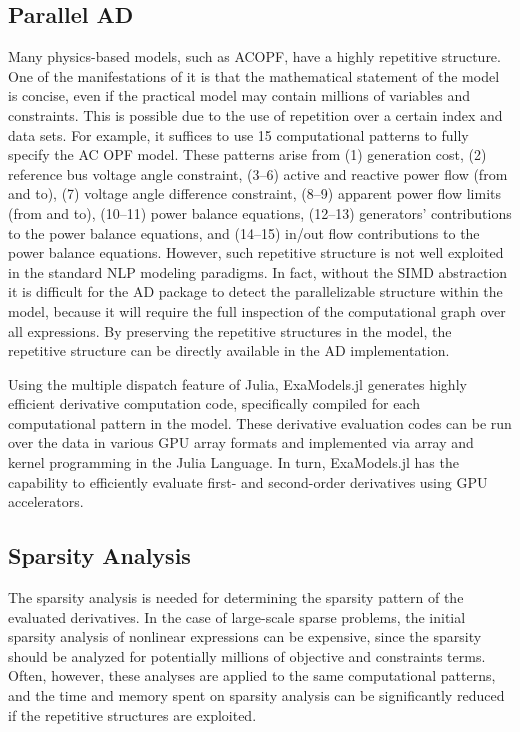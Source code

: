 \documentclass{IEEEtran4PSCC} %
\begin{document}
\subsection{Parallel AD}
\label{sec:simd:ad}
Many physics-based models, such as ACOPF, have a highly repetitive
structure. One of the manifestations of it is that the mathematical
statement of the model is concise, even if the practical model may contain
millions of variables and constraints. This is possible due to the use of
repetition over a certain index and data sets. For example,
it suffices to use 15 computational patterns to fully specify the
AC OPF model. These patterns arise from (1) generation cost, (2) reference
bus voltage angle constraint, (3--6) active and reactive power flow (from and to),
(7) voltage angle difference constraint, (8--9) apparent
power flow limits (from and to), (10--11) power balance equations,
(12--13) generators' contributions to the power balance equations, and
(14--15) in/out flow contributions to the power balance
equations. However, such repetitive structure is not well exploited in
the standard NLP modeling paradigms. In fact, without the SIMD
abstraction it is difficult for the AD package to detect the
parallelizable structure within the model, because it will require the full
inspection of the computational graph over all expressions.  By
preserving the repetitive structures in the model, the repetitive
structure can be directly available in the AD implementation.

Using the multiple dispatch feature of Julia, ExaModels.jl generates
highly efficient derivative computation code, specifically compiled
for each computational pattern in the model. These derivative evaluation codes can be run over the data in various GPU array formats
and implemented via array and kernel programming in the Julia Language. In
turn, ExaModels.jl has the capability to efficiently evaluate first- and
second-order derivatives using GPU accelerators.

\subsection{Sparsity Analysis}
The sparsity analysis is needed for determining the sparsity pattern
of the evaluated derivatives. In the case of large-scale sparse
problems, the initial sparsity analysis of nonlinear expressions can
be expensive, since the sparsity should be analyzed for potentially
millions of objective and constraints terms. Often, however, 
these analyses are applied to the same computational patterns, and
the time and memory spent on sparsity analysis can be significantly
reduced if the repetitive structures are exploited.
\end{document}
